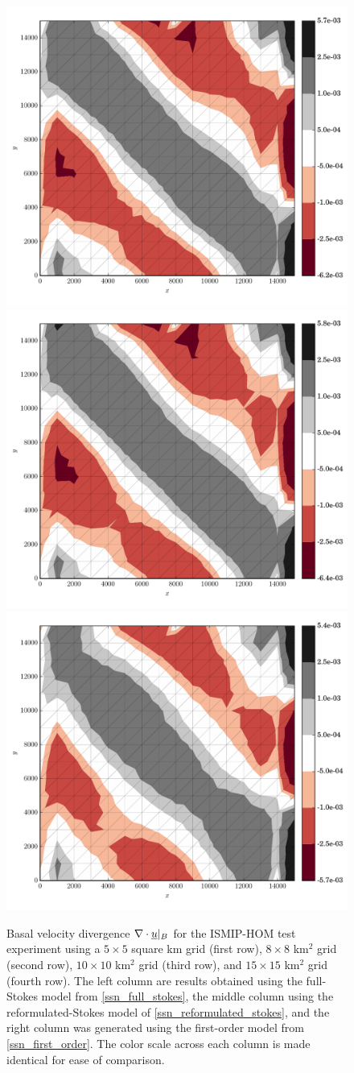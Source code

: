 \begin{figure}
    \includegraphics[width=0.3\linewidth]{images/momentum/ISMIP_HOM_A/large/FS/divU.pdf}
    \quad                                           
    \includegraphics[width=0.3\linewidth]{images/momentum/ISMIP_HOM_A/large/RS/divU.pdf}
    \quad                                           
    \includegraphics[width=0.3\linewidth]{images/momentum/ISMIP_HOM_A/large/BP/divU.pdf}

  \caption[ISMIP-HOM momentum experiment velocity divergence]{Basal velocity divergence $\nabla \cdot \underline{u} |_B$ for the ISMIP-HOM test experiment using a $5 \times 5$ square km grid (first row), $8 \times 8$ km$^2$ grid (second row), $10 \times 10$ km$^2$ grid (third row), and $15 \times 15$ km$^2$ grid (fourth row).  The left column are results obtained using the full-Stokes model from \cref{ssn_full_stokes}, the middle column using the reformulated-Stokes model of \cref{ssn_reformulated_stokes}, and the right column was generated using the first-order model from \cref{ssn_first_order}. The color scale across each column is made identical for ease of comparison.}
  \label{ismip_hom_a_divergence}
\end{figure}

